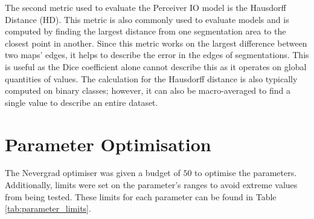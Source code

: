 \documentclass{l4proj}
\begin{document}
The second metric used to evaluate the Perceiver IO model is the Hausdorff Distance (HD). This metric is also commonly used to evaluate models and is computed by finding the largest distance from one segmentation area to the closest point in another. Since this metric works on the largest difference between two maps’ edges, it helps to describe the error in the edges of segmentations. This is useful as the Dice coefficient alone cannot describe this as it operates on global quantities of values. The calculation for the Hausdorff distance is also typically computed on binary classes; however, it can also be macro-averaged to find a single value to describe an entire dataset.

\section{Parameter Optimisation} \label{sec:eval_param_optimisation}

The Nevergrad optimiser was given a budget of $50$ to optimise the parameters. Additionally, limits were set on the parameter’s ranges to avoid extreme values from being tested. These limits for each parameter can be found in Table \ref{tab:parameter_limits}.
\end{document}
